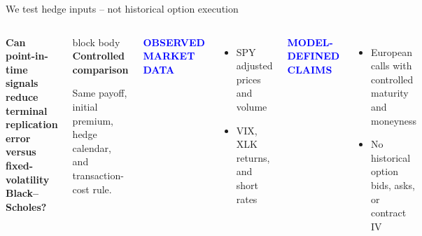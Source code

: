 \documentclass[aspectratio=169,10pt]{beamer}
\newcommand{\tagline}[1]{\textcolor{Blue}{\bfseries\scriptsize\MakeUppercase{#1}}}
\begin{document}
\begin{frame}{We test hedge inputs -- not historical option execution}
\begin{columns}[T,onlytextwidth]
\vspace{0.4cm}
{\fontsize{19}{23}\selectfont\bfseries Can point-in-time signals reduce terminal replication error versus fixed-volatility Black--Scholes?}

\vspace{0.55cm}
\begin{beamercolorbox}[rounded=true,sep=0.3cm]{block body}
\textbf{Controlled comparison}\par
Same payoff, initial premium, hedge calendar, and transaction-cost rule.
\end{beamercolorbox}

\tagline{Observed market data}
\begin{itemize}
  \item SPY adjusted prices and volume
  \item VIX, XLK returns, and short rates
\end{itemize}
\vspace{0.25cm}
\tagline{Model-defined claims}
\begin{itemize}
  \item European calls with controlled maturity and moneyness
  \item No historical option bids, asks, or contract IV
\end{itemize}
\end{columns}
\end{frame}
\end{document}
